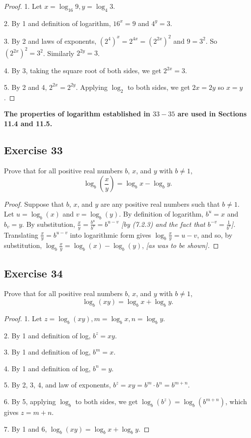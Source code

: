 \documentclass[14pt]{extarticle}
\newcommand{\cy}{\color{cyan}}
\begin{document}
\begin{proof}
    1. Let \(x = \log_{16} 9, y = \log_4 3\).

    2. By 1 and definition of logarithm, \(16^x = 9\) and \(4^y = 3\).

    3. By 2 and laws of exponents, \((2^4)^x = 2^{4x} = (2^{2x})^2\) and \(9 = 3^2\). So \((2^{2x})^2 = 3^2\).
    Similarly \(2^{2y} = 3\).

    4. By 3, taking the square root of both sides, we get \(2^{2x} = 3\).

    5. By 2 and 4, \(2^{2x} = 2^{2y}\). Applying \(\log_2\) to both sides, we get $2x = 2y$ so $x = y$.
\end{proof}

{\bf \cy The properties of logarithm established in $33-35$ are used in Sections 11.4 and 11.5.}

\subsection{Exercise 33}
Prove that for all positive real numbers $b$, $x$, and $y$ with \(b \neq 1\),
\[
    \log_b\left(\frac{x}{y}\right) = \log_b x - \log_b y.
\]
\begin{proof}
    Suppose that $b$, $x$, and $y$ are any positive real numbers such that \(b \neq 1\). Let \(u = \log_b(x)\) and
    \(v = \log_b(y)\). By definition of logarithm, \(b^u = x\) and \(b_v = y\). By substitution, \(\frac{x}{y} =
    \frac{b^u}{b^v} = b^{u-v}\) {\it [by (7.2.3) and the fact that \(b^{-v} = \frac{1}{b^v}\)].} Translating
    \(\frac{x}{y} = b^{u-v}\) into logarithmic form gives \(\log_b \frac{x}{y} = u-v\), and so, by substitution,
    \(\log_b \frac{x}{y} = \log_b(x) - \log_b(y)\), {\it [as was to be shown].}
\end{proof}

\subsection{Exercise 34}
Prove that for all positive real numbers $b$, $x$, and $y$ with \(b \neq 1\),
\[
    \log_b(xy) = \log_b x + \log_b y.
\]
\begin{proof}
    1. Let \(z = \log_b(xy), m = \log_b x, n = \log_b y\).

    2. By 1 and definition of log, \(b^z = xy\).

    3. By 1 and definition of log, \(b^m = x\).

    4. By 1 and definition of log, \(b^n = y\).

    5. By 2, 3, 4, and law of exponents, \(b^z = xy = b^m \cdot b^n = b^{m+n}\).

    6. By 5, applying $\log_b$ to both sides, we get \(\log_b(b^z) = \log_b(b^{m+n})\), which gives $z = m+n$.

    7. By 1 and 6, \(\log_b(xy) = \log_b x + \log_b y\).
\end{proof}
\end{document}

